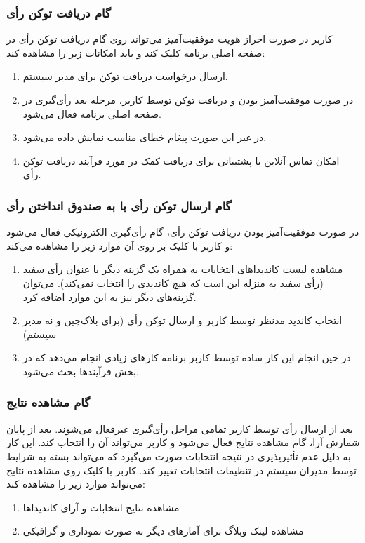 \documentclass[12pt]{article}
\begin{document}
\subsubsection{گام دریافت توکن رأی}
 کاربر در صورت احراز هویت موفقیت‌آمیز می‌تواند روی گام دریافت توکن رأی در صفحه اصلی برنامه کلیک کند و باید امکانات زیر را مشاهده کند: 
\begin{enumerate}[label=(\arabic*)]
\item
ارسال درخواست دریافت توکن برای مدیر سیستم. 
\item
در صورت موفقیت‌آمیز بودن و دریافت توکن توسط کاربر، مرحله بعد رأی‌گیری در صفحه اصلی برنامه فعال می‌شود.
\item
در غیر این صورت پیغام خطای مناسب نمایش داده می‌شود. 
\item
امکان تماس آنلاین با پشتیبانی برای دریافت کمک در مورد فرآیند دریافت توکن رأی.  
\end{enumerate}


\subsubsection{گام ارسال توکن رأی یا به صندوق انداختن رأی}
در صورت موفقیت‌آمیز بودن دریافت توکن رأی، گام رأی‌گیری الکترونیکی فعال می‌شود و کاربر با کلیک بر روی آن موارد زیر را مشاهده می‌کند: 
\begin{enumerate}[label=(\arabic*)]
\item
مشاهده لیست کاندیداهای انتخابات به همراه یک گزینه دیگر با عنوان رأی سفید (رأی سفید به منزله این است که هیچ کاندیدی را انتخاب نمی‌کند). می‌توان گزینه‌های دیگر نیز به این موارد اضافه کرد. 
\item
انتخاب کاندید مدنظر توسط کاربر و ارسال توکن رأی (برای بلاک‌چین و نه مدیر سیستم)
\item
در حین انجام این کار ساده توسط کاربر برنامه کارهای زیادی انجام می‌دهد که در بخش فرآیندها بحث می‌شود. 
\end{enumerate}

\subsubsection{گام مشاهده نتایج}
بعد از ارسال رأی توسط کاربر تمامی مراحل رأی‌گیری غیرفعال می‌شوند. بعد از پایان شمارش آرا، گام مشاهده نتایج فعال می‌شود و کاربر می‌تواند آن را انتخاب کند. این کار به دلیل عدم تأثیرپذیری در نتیجه انتخابات صورت می‌گیرد که می‌تواند بسته به شرایط توسط مدیران سیستم در تنظیمات انتخابات تغییر کند. کاربر با کلیک روی مشاهده نتایج می‌تواند موارد زیر را مشاهده کند:
\begin{enumerate}[label=(\arabic*)]
\item
مشاهده نتایج انتخابات و آرای کاندیداها
\item
مشاهده لینک وبلاگ برای آمارهای دیگر به صورت نموداری و گرافیکی
\end{enumerate}
\end{document}
